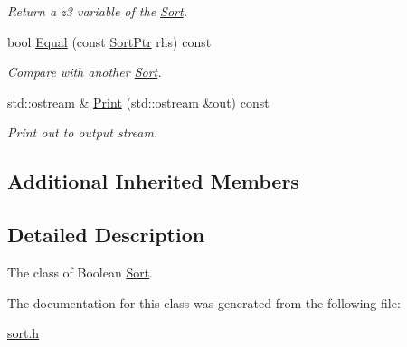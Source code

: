 \begin{DoxyCompactItemize}
\begin{DoxyCompactList}\small\item\em Return a z3 variable of the \mbox{\hyperlink{classilang_1_1_sort}{Sort}}. \end{DoxyCompactList}\item 
\mbox{\label{classilang_1_1_sort_bool_ad4c4299681b7a486c022e7b3ef6f1d28}} 
bool \mbox{\hyperlink{classilang_1_1_sort_bool_ad4c4299681b7a486c022e7b3ef6f1d28}{Equal}} (const \mbox{\hyperlink{classilang_1_1_sort_a8b9cc5e381404211a1c0423327866d3b}{Sort\+Ptr}} rhs) const
\begin{DoxyCompactList}\small\item\em Compare with another \mbox{\hyperlink{classilang_1_1_sort}{Sort}}. \end{DoxyCompactList}\item 
\mbox{\label{classilang_1_1_sort_bool_a8f489cb011dc5c6d5656839d7783de2f}} 
std\+::ostream \& \mbox{\hyperlink{classilang_1_1_sort_bool_a8f489cb011dc5c6d5656839d7783de2f}{Print}} (std\+::ostream \&out) const
\begin{DoxyCompactList}\small\item\em Print out to output stream. \end{DoxyCompactList}\end{DoxyCompactItemize}
\subsection*{Additional Inherited Members}


\subsection{Detailed Description}
The class of Boolean \mbox{\hyperlink{classilang_1_1_sort}{Sort}}. 

The documentation for this class was generated from the following file\+:\begin{DoxyCompactItemize}
\item 
\mbox{\hyperlink{sort_8h}{sort.\+h}}\end{DoxyCompactItemize}
